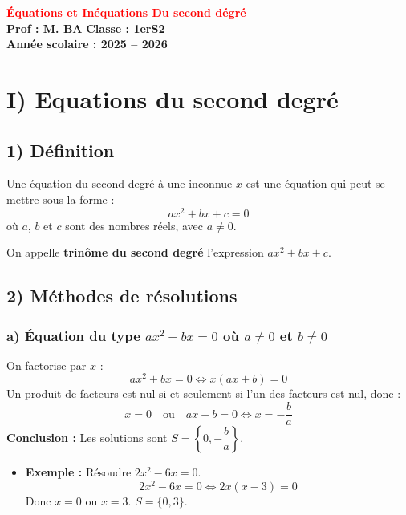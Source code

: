 \documentclass[12pt,a4paper]{article}
\newcounter{solution}
\begin{document}
\begin{center}
    \Large\textbf{\underline{\textcolor{red}{Équations et Inéquations Du second dégré}}}\\[-0.1cm]
    \normalsize\textbf{Prof : M. BA} \hfill \textbf{Classe : 1erS2}\\[-0.1cm]
    \textbf{Année scolaire : 2025 -- 2026}
\end{center}

\vspace{1em}

\section*{\color{myred} I) Equations du second degré}

\subsection*{\color{myred} 1) Définition}
Une équation du second degré à une inconnue $x$ est une équation qui peut se mettre sous la forme :
\[
ax^2 + bx + c = 0
\]
où $a$, $b$ et $c$ sont des nombres réels, avec $a \neq 0$.

On appelle \textbf{trinôme du second degré} l'expression $ax^2 + bx + c$.

\subsection*{\color{myred} 2) Méthodes de résolutions}

\subsubsection*{\color{myred} a) Équation du type $ax^2 + bx = 0$ où $a \neq 0$ et $b \neq 0$}
On factorise par $x$ :
\[
ax^2 + bx = 0 \iff x(ax + b) = 0
\]
Un produit de facteurs est nul si et seulement si l'un des facteurs est nul, donc :
\[
x = 0 \quad \text{ou} \quad ax + b = 0 \iff x = -\frac{b}{a}
\]
\textbf{Conclusion :} Les solutions sont $S = \left\{0, -\dfrac{b}{a}\right\}$.

\begin{itemize}
    \item \textbf{Exemple :} Résoudre $2x^2 - 6x = 0$.
    \[
    2x^2 - 6x = 0 \iff 2x(x-3) = 0
    \]
    Donc $x=0$ ou $x=3$. \quad $S = \{0, 3\}$.
\end{itemize}
\end{document}
